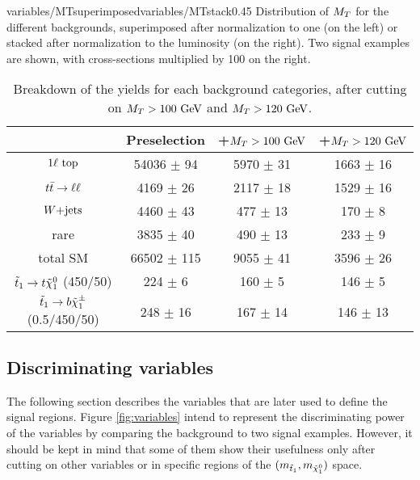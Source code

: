                      {variables/MTsuperimposed}{variables/MTstack}{0.45}
                     {Distribution of $M_T$ for the different backgrounds,
                     superimposed after normalization to one (on the left) or 
                     stacked after normalization to the luminosity (on the right).
                     Two signal examples are shown, with cross-sections multiplied by 100
                     on the right.}

    \begin{table}[h!]
        \centering
        \begin{tabular}{|c|ccc|}
            \hline
                          & Preselection       & +$M_T > 100 ~\text{GeV}$   & +$M_T > 120 ~\text{GeV}$     \\
            \hline
        $1\ell~\text{top}$   & 54036 $\pm$ 94     &  5970 $\pm$ 31      &  1663 $\pm$ 16       \\
        $t\bar{t} \rightarrow \ell \ell$    &  4169 $\pm$ 26     &  2117 $\pm$ 18      &  1529 $\pm$ 16       \\
        $\text{$W$+jets}$          &  4460 $\pm$ 43     &   477 $\pm$ 13      &   170 $\pm$ 8        \\
        rare              &  3835 $\pm$ 40     &   490 $\pm$ 13      &   233 $\pm$ 9        \\
            \hline
        total SM          & 66502 $\pm$ 115    &  9055 $\pm$ 41      &  3596 $\pm$ 26       \\
            \hline
$\tilde{t}_1 \rightarrow t \tilde{\chi}_1^0$   (450/50) & 224 $\pm$ 6         & 160 $\pm$ 5   & 146 $\pm$ 5   \\ 
$\tilde{t}_1 \rightarrow b \tilde{\chi}_1^\pm$ (0.5/450/50) & 248 $\pm$ 16        & 167 $\pm$ 14  & 146 $\pm$ 13  \\
            \hline
        \end{tabular}
        \caption{Breakdown of the yields for each background categories, after cutting on $M_T > 100 ~\text{GeV}$ and $M_T > 120 ~\text{GeV}$.}
        \label{tab:MTcutImpact}
    \end{table}

        \subsection{Discriminating variables}

        The following section describes the variables that are later used to define the 
        signal regions. Figure \ref{fig:variables} intend to represent the discriminating
        power of the variables by comparing the background to two signal examples. However, 
        it should be kept in mind that some of them show their usefulness only after 
        cutting on other variables or in specific regions of the $(m_{\tilde{t}_1},m_{\tilde{\chi}_1^0})$ space.
           
